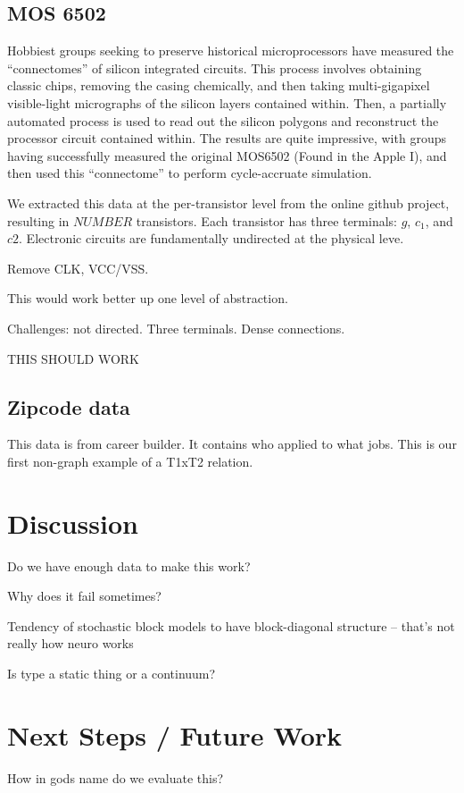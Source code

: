 \documentclass{article}
\begin{document}
\subsection{MOS 6502}

Hobbiest groups seeking to preserve historical microprocessors have
measured the ``connectomes'' of silicon integrated circuits. This
process involves obtaining classic chips, removing the casing
chemically, and then taking multi-gigapixel visible-light micrographs
of the silicon layers contained within. Then, a partially automated
process is used to read out the silicon polygons and reconstruct the
processor circuit contained within. The results are quite impressive,
with groups having successfully measured the original MOS6502 (Found
in the Apple I), and then used this ``connectome'' to perform
cycle-accruate simulation.

We extracted this data at the per-transistor level from the online
github project, resulting in $NUMBER$ transistors. Each transistor has
three terminals: $g$, $c_1$, and $c2$. Electronic circuits are fundamentally
undirected at the physical leve. 

Remove CLK, VCC/VSS. 

This would work better up one level of abstraction. 


Challenges: not directed. Three terminals. Dense connections. 

THIS SHOULD WORK

\subsection{Zipcode data}

This data is from career builder. It contains who applied to what jobs. This is our first non-graph example of a T1xT2 relation. 



\section{Discussion}
Do we have enough data to make this work? 

Why does it fail sometimes? 

Tendency of stochastic block models to have block-diagonal structure -- that's not really how neuro works

Is type a static thing or a continuum? 


\section{Next Steps / Future Work}
How in gods name do we evaluate this? 
\end{document}
